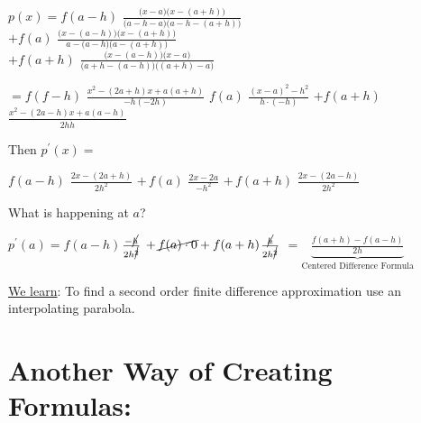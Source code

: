 \documentclass[a4paper,12pt]{report}
\begin{document}
\begin{multicols}{2}
\begin{flushright}
	\vspace{-5mm}
	$p(x) = f(a-h)$ \large $\!\! \frac{\big( x-a \big) \big( x-(a+h) \big)}{\big(a-h-a \big) \big( a-h-(a+h) \big)}$\\
 	\medskip
 	\normalsize $ + f(a)$  \large $\!\! \frac{\big( x-(a-h) \big) \big( x-(a+h) \big)}{ a- \big( a-h \big)  \big( a-(a+h) \big)}$\\
 	\medskip
 	\normalsize $+ f(a+h)$ \large $\!\! \frac{\big( x-(a-h) \big) \big( x-a \big)}{\big( a+h - (a-h) \big) \big( (a+h) -a \big)}$

\end{flushright}
\end{multicols}

\vspace{5mm}

\begin{center}
	\normalsize $=f(f-h)$ \large $\frac{ x^2-(2a+h)x + a(a+h) }{ -h(-2h) }$ \normalsize $f(a)$ \large $\frac{(x-a)^2-h^2}{h \cdot (-h)}$ \normalsize $+ f(a+h)$ \large $\!\! \frac{x^2-(2a-h)x + a(a-h) }{ 2h \dot h}$
\end{center}
	
	\noindent Then $p^\prime (x) =$
	
\begin{center}
\vspace{-3mm}
	$f(a-h)$ \large $\!\! \frac{2x - (2a+h)}{2h^2}$ \normalsize $+ \, f(a)$ \large $\!\! \frac{2x-2a}{-h^2}$ \normalsize $+ \, f(a+h)$ \large $\!\! \frac{2x - (2a-h)}{2h^2}$
\end{center}

	\noindent What is happening at $a$?
	
\begin{center}
\vspace{-3mm}
	$p^\prime(a)= f(a-h)$ \large $\!\! \frac{- \cancel{h}}{2h^{\cancel{2}}}$ \normalsize $+ \, \cancel {f(a) \cdot 0} + f(a+h)$
	\large $\!\!\frac{\cancel{h}}{2h^{\cancel{2}}}$
	\normalsize $=\underbrace{   \frac{f(a+h) - f(a-h)}{2h} }_{\text{Centered Difference Formula}} $
\end{center}
	
	\noindent  \underline{We learn}: To find a second order finite difference approximation use an interpolating parabola.
	
\section{Another Way of Creating Formulas:}
\end{document}
